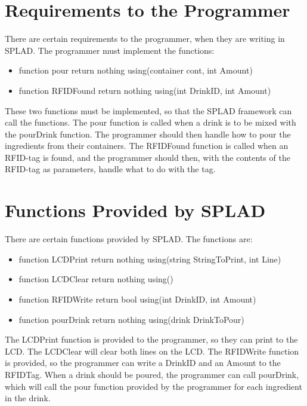 \section{Requirements to the Programmer}
There are certain requirements to the programmer, when they are writing in SPLAD. The programmer must implement the functions:
\begin{itemize}
	\item {\color[rgb]{0,0,1}function} pour {\color[rgb]{0,0,1}return} {\color[rgb]{0.545,0.133,0.133}nothing} {\color[rgb]{0,0,1}using}({\color[rgb]{0.545,0.133,0.133}container} cont, {\color[rgb]{0.545,0.133,0.133}int} Amount)
	\item {\color[rgb]{0,0,1}function} RFIDFound {\color[rgb]{0,0,1}return} {\color[rgb]{0.545,0.133,0.133}nothing} {\color[rgb]{0,0,1}using}({\color[rgb]{0.545,0.133,0.133}int} DrinkID, {\color[rgb]{0.545,0.133,0.133}int} Amount)
\end{itemize}
These two functions must be implemented, so that the SPLAD framework can call the functions. The pour function is called when a drink is to be mixed with the pourDrink function. The programmer should then handle how to pour the ingredients from their containers.
The RFIDFound function is called when an RFID-tag is found, and the programmer should then, with the contents of the RFID-tag as parameters, handle what to do with the tag.

\section{Functions Provided by SPLAD}
There are certain functions provided by SPLAD. The functions are:
\begin{itemize}
	\item {\color[rgb]{0,0,1}function} LCDPrint {\color[rgb]{0,0,1}return} {\color[rgb]{0.545,0.133,0.133}nothing} {\color[rgb]{0,0,1}using}({\color[rgb]{0.545,0.133,0.133}string} StringToPrint, {\color[rgb]{0.545,0.133,0.133}int} Line)
	\item {\color[rgb]{0,0,1}function} LCDClear {\color[rgb]{0,0,1}return} {\color[rgb]{0.545,0.133,0.133}nothing} {\color[rgb]{0,0,1}using}()
	\item {\color[rgb]{0,0,1}function} RFIDWrite {\color[rgb]{0,0,1}return} {\color[rgb]{0.545,0.133,0.133}bool} {\color[rgb]{0,0,1}using}({\color[rgb]{0.545,0.133,0.133}int} DrinkID, {\color[rgb]{0.545,0.133,0.133}int} Amount)
	\item {\color[rgb]{0,0,1}function} pourDrink {\color[rgb]{0,0,1}return} {\color[rgb]{0.545,0.133,0.133}nothing} {\color[rgb]{0,0,1}using}({\color[rgb]{0.545,0.133,0.133}drink} DrinkToPour)
\end{itemize}
The LCDPrint function is provided to the programmer, so they can print to the LCD. The LCDClear will clear both lines on the LCD. The RFIDWrite function is provided, so the programmer can write a DrinkID and an Amount to the RFIDTag. When a drink should be poured, the programmer can call pourDrink, which will call the pour function provided by the programmer for each ingredient in the drink.